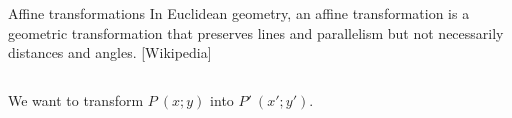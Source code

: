 \documentclass[9pt, aspectratio=169]{beamer}
\begin{document}
\begin{frame}
    {Affine transformations}
    In Euclidean geometry, an affine transformation is a geometric transformation that preserves lines and parallelism but not necessarily distances and angles. [Wikipedia]
    \vspace{2em}

    \begin{columns}
        \begin{column}{0.5\textwidth}{
                \centering

                We want to transform $P~(x;y)$ into $P'~(x';y')$.

}
\end{column}
\end{columns}
\end{frame}
\end{document}
